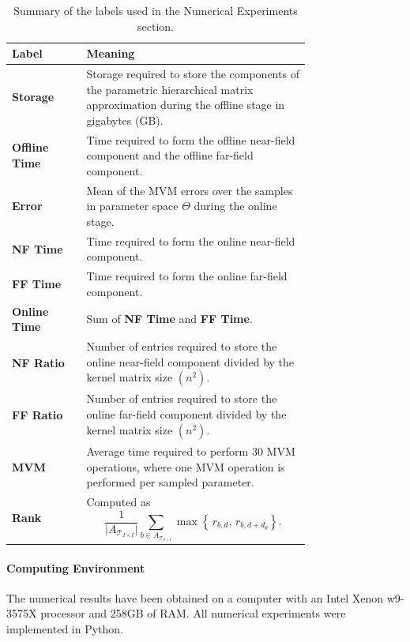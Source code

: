 \documentclass[final,3p,times]{elsarticle}
\begin{document}
\begin{table}[!ht]
\centering
\scriptsize
\begin{tabular}{@{}lp{0.75\linewidth}@{}} 
\toprule
\textbf{Label} & \textbf{Meaning} \\
\midrule
\textbf{Storage} & Storage required to store the components of the parametric hierarchical matrix approximation during the offline stage in gigabytes (GB).\\

\textbf{Offline Time} & Time required to form the offline near-field component and the offline far-field component. \\

\textbf{Error} & Mean of the MVM errors over the samples in parameter space $\Theta$ during the online stage. \\

\textbf{NF Time} & Time required to form the online near-field component. \\

\textbf{FF Time} & Time required to form the online far-field component. \\

\textbf{Online Time} & Sum of \textbf{NF Time} and \textbf{FF Time}. \\

\textbf{NF Ratio} & Number of entries required to store the online near-field component divided by the kernel matrix size $(n^2)$. \\

\textbf{FF Ratio} & Number of entries required to store the online far-field component divided by the kernel matrix size $(n^2)$. \\

\textbf{MVM} & Average time required to perform $30$ MVM operations, where one MVM operation is performed per sampled parameter.  \\ 

\textbf{Rank} & Computed as \[
\frac{1}{\big|A_{\mathcal{T}_{I\times I}}\big|}\sum_{b\in A_{\mathcal{T}_{I\times I}}}
\max\!\left\{\,r_{b,d},\, r_{b,d+d_\theta}\right\}.
\]
 \\ 
\bottomrule
\end{tabular}
\caption{Summary of the labels used in the Numerical Experiments section.}
\label{tab:numlabels}
\end{table}





\paragraph{Computing Environment}
The numerical results have been obtained on a computer with an Intel Xenon w9-3575X processor and 258GB of RAM. All numerical experiments were implemented in Python. 
\end{document}
